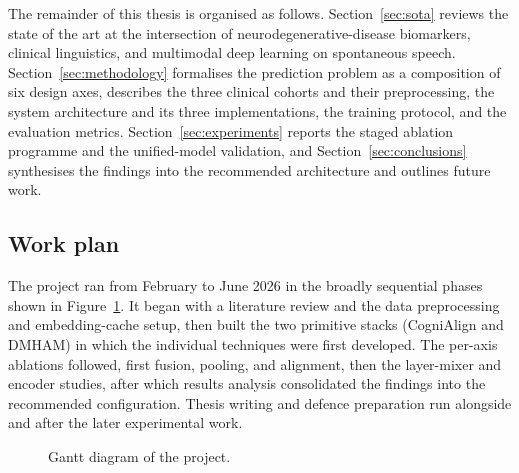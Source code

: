 The remainder of this thesis is organised as follows. Section~\ref{sec:sota} reviews the state of the art at the intersection of neurodegenerative-disease biomarkers, clinical linguistics, and multimodal deep learning on spontaneous speech. Section~\ref{sec:methodology} formalises the prediction problem as a composition of six design axes, describes the three clinical cohorts and their preprocessing, the system architecture and its three implementations, the training protocol, and the evaluation metrics. Section~\ref{sec:experiments} reports the staged ablation programme and the unified-model validation, and Section~\ref{sec:conclusions} synthesises the findings into the recommended architecture and outlines future work.

\subsection{Work plan}
\label{ssec:workplan}

The project ran from February to June 2026 in the broadly sequential phases shown in Figure~\ref{fig:gantt}. It began with a literature review and the data preprocessing and embedding-cache setup, then built the two primitive stacks (CogniAlign and DMHAM) in which the individual techniques were first developed. The per-axis ablations followed, first fusion, pooling, and alignment, then the layer-mixer and encoder studies, after which results analysis consolidated the findings into the recommended configuration. Thesis writing and defence preparation run alongside and after the later experimental work.

\begin{figure}[H]
    \centering
    
    \caption{Gantt diagram of the project.}
    \label{fig:gantt}
\end{figure}
